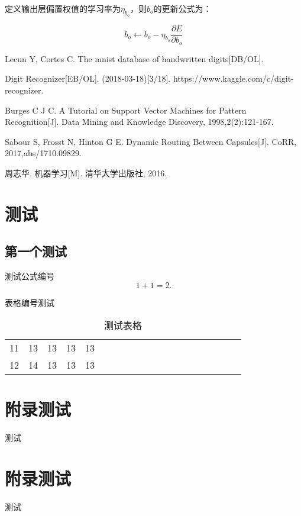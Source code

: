 \documentclass[forprint]{WHUBachelor}
\begin{document}
      定义输出层偏置权值的学习率为$\eta_{b_o}$，则$b_o$的更新公式为：

      \begin{equation}
        b_o\gets b_o-\eta_{b_o}\frac{\partial{E}}{\partial{b_o}}
      \end{equation}


\cleardoublepage{}
{}
\begin{thebibliography}{00}

   Lecun Y, Cortes C. The mnist database of handwritten digits[DB/OL]. 

   Digit Recognizer[EB/OL]. (2018-03-18)[3/18]. https://www.kaggle.com/c/digit-recognizer.

   Burges C J C. A Tutorial on Support Vector Machines for Pattern Recognition[J]. Data Mining and Knowledge Discovery, 1998,2(2):121-167.

   Sabour S, Frosst N, Hinton G E. Dynamic Routing Between Capsules[J]. CoRR, 2017,abs/1710.09829.

   周志华. 机器学习[M]. 清华大学出版社, 2016.
\end{thebibliography}


\appendix

\chapter{测试}

\section{第一个测试}
测试公式编号
\begin{equation}
1+1=2.
\end{equation}

表格编号测试

\begin{table}[h]
  \centering
  \caption{测试表格}
  \begin{tabular}{*{20}c}
     \hline
     11 & 13  & 13  & 13  & 13 \\
     12 & 14  & 13  & 13  & 13 \\
     \hline
   \end{tabular}
\end{table}


\chapter{附录测试}

测试

\chapter{附录测试}

测试

\cleardoublepage
\end{document}
